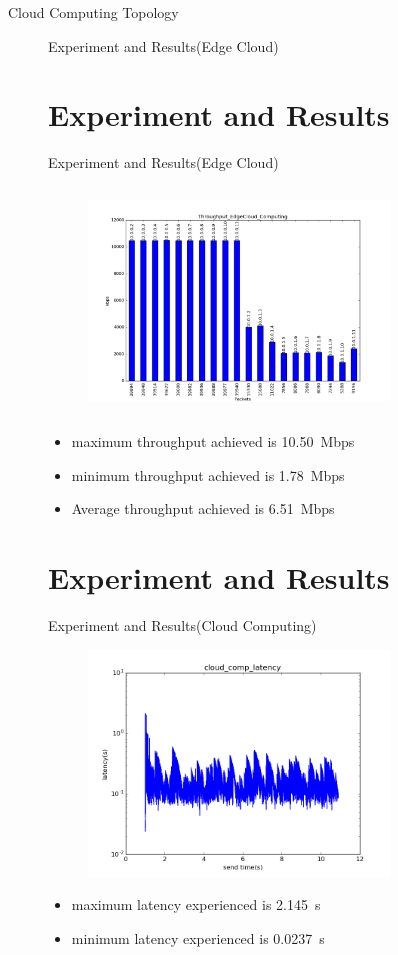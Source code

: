 \documentclass{beamer}
\begin{document}
\begin{frame}{Cloud Computing Topology}
\begin{figure}
\begin{frame}{Experiment and Results\big(Edge Cloud\big)}
\end{frame}
\section{Experiment and Results}
\begin{frame}{Experiment and Results\big(Edge Cloud\big)}
\begin{figure}
\includegraphics[width=8cm, height=6cm]{edgecloud}
\centering
\end{figure}
\begin{itemize}

	\item maximum throughput achieved is \SI{10.50}Mbps
	\item minimum throughput achieved is \SI{1.78}Mbps
	\item Average throughput achieved is \SI{6.51}Mbps
\end{itemize}

\end{frame}
\section{Experiment and Results}
\begin{frame}{Experiment and Results\big(Cloud Computing\big)}
\begin{figure}
\includegraphics[width=8cm, height=6cm]{newcloudlatency}
\centering
\end{figure}
\begin{itemize}
	\item maximum latency experienced is \SI{2.145}{\second}
	\item minimum latency experienced is \SI{.0237}{\second} 
\end{itemize}


\end{frame}
\end{figure}
\end{frame}
\end{document}
